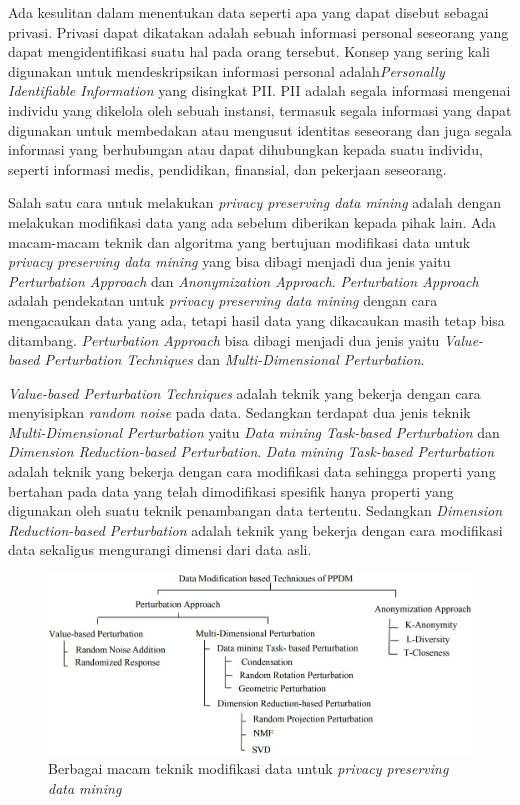 \documentclass[a4paper,twoside]{article}
\begin{document}
Ada kesulitan dalam menentukan data seperti apa yang dapat disebut sebagai privasi. Privasi dapat dikatakan adalah sebuah informasi personal seseorang yang dapat mengidentifikasi suatu hal pada orang tersebut. Konsep yang sering kali digunakan untuk mendeskripsikan informasi personal adalah\textit{Personally Identifiable Information} yang disingkat PII. PII adalah segala informasi mengenai individu yang dikelola oleh sebuah instansi, termasuk segala informasi yang dapat digunakan untuk membedakan atau mengusut identitas seseorang dan juga segala informasi yang berhubungan atau dapat dihubungkan kepada suatu individu, seperti informasi medis, pendidikan, finansial, dan pekerjaan seseorang. 

Salah satu cara untuk melakukan \textit{privacy preserving data mining} adalah dengan melakukan modifikasi data yang ada sebelum diberikan kepada pihak lain. Ada macam-macam teknik dan algoritma yang bertujuan modifikasi data untuk \textit{privacy preserving data mining} yang bisa dibagi menjadi dua jenis yaitu \textit{Perturbation Approach} dan \textit{Anonymization Approach}. \textit{Perturbation Approach} adalah pendekatan untuk \textit{privacy preserving data mining} dengan cara mengacaukan data yang ada, tetapi hasil data yang dikacaukan masih tetap bisa ditambang. \textit{Perturbation Approach} bisa dibagi menjadi dua jenis yaitu \textit{Value-based Perturbation Techniques} dan \textit{Multi-Dimensional Perturbation}.

\textit{Value-based Perturbation Techniques} adalah teknik yang bekerja dengan cara menyisipkan \textit{random noise} pada data. Sedangkan terdapat dua jenis teknik \textit{Multi-Dimensional Perturbation} yaitu \textit{Data mining Task-based Perturbation} dan \textit{Dimension Reduction-based Perturbation}. \textit{Data mining Task-based Perturbation} adalah teknik yang bekerja dengan cara modifikasi data sehingga properti yang bertahan pada data yang telah dimodifikasi spesifik hanya properti yang digunakan oleh suatu teknik penambangan data tertentu. Sedangkan \textit{Dimension Reduction-based Perturbation} adalah teknik yang bekerja dengan cara modifikasi data sekaligus mengurangi dimensi dari data asli.

\begin{figure}
	\centering
	\includegraphics[scale=0.56]{ppdm}
	\caption{Berbagai macam teknik modifikasi data untuk \textit{privacy preserving data mining}}
	\label{fig:ppdm}
\end{figure}
\end{document}
